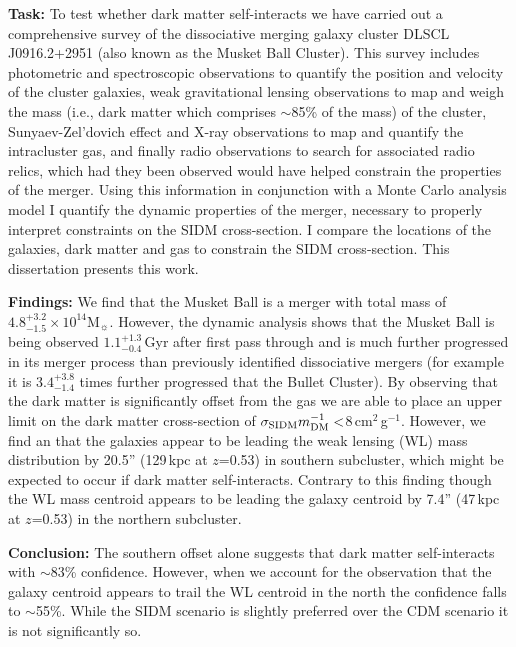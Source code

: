 \noindent\textbf{Task:} 
To test whether dark matter self-interacts we have carried out a comprehensive survey of the dissociative merging galaxy cluster DLSCL J0916.2+2951 (also known as the Musket Ball Cluster).
This survey includes photometric and spectroscopic observations to quantify the position and velocity of the cluster galaxies,
weak gravitational lensing observations to map and weigh the mass (i.e., dark matter which comprises $\sim$85\% of the mass) of the cluster,
Sunyaev-Zel'dovich effect and X-ray observations to map and quantify the intracluster gas,
and finally radio observations to search for associated radio relics, which had they been observed would have helped constrain the properties of the merger.
Using this information in conjunction with a Monte Carlo analysis model I quantify the dynamic properties of the merger, necessary to properly interpret constraints on the SIDM cross-section.
I compare the locations of the galaxies, dark matter and gas to constrain the SIDM cross-section.
This dissertation presents this work.

\noindent\textbf{Findings:} 
We find that the Musket Ball is a merger with total mass of  $4.8^{+3.2}_{-1.5}\times 10^{14}$M$_\sun$.
However, the dynamic analysis shows that the Musket Ball is being observed $1.1^{+1.3}_{-0.4}$\,Gyr after first pass through and is much further progressed in its merger process than previously identified dissociative mergers (for example it is $3.4^{+3.8}_{-1.4}$ times further progressed that the Bullet Cluster). 
By observing that the dark matter is significantly offset from the gas we are able to place an upper limit on the dark matter cross-section of $\sigma_{\rm SIDM}m^{-1}_{\rm DM} <$8\,cm$^2$\,g$^{-1}$.
However, we find an that the galaxies appear to be leading the weak lensing (WL) mass distribution by 20.5'' (129\,kpc at $z$=0.53) in southern subcluster, which might be expected to occur if dark matter self-interacts.
Contrary to this finding though the WL mass centroid appears to be leading the galaxy centroid by 7.4'' (47\,kpc at $z$=0.53) in the northern subcluster. 


\noindent\textbf{Conclusion:}
The southern offset alone suggests that  dark matter self-interacts with $\sim$83\% confidence.
However, when we account for the observation that the galaxy centroid appears to trail the WL centroid in the north the confidence falls to $\sim$55\%.
While the SIDM scenario is slightly preferred over the CDM scenario it is not significantly so.

